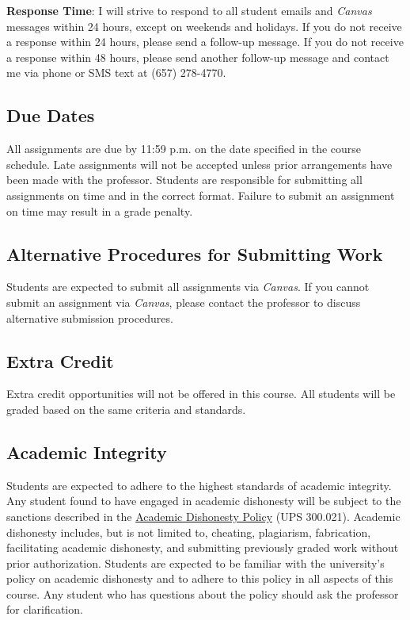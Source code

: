 \documentclass[12pt, letterpaper]{article}
\begin{document}
\textbf{Response Time}: I will strive to respond to all student emails and \emph{Canvas} messages within 24 hours, except on weekends and holidays. If you do not receive a response within 24 hours, please send a follow-up message. If you do not receive a response within 48 hours, please send another follow-up message and contact me via phone or SMS text at (657) 278-4770.

\subsection*{Due Dates}
All assignments are due by 11:59 p.m. on the date specified in the course schedule. Late assignments will not be accepted unless prior arrangements have been made with the professor. Students are responsible for submitting all assignments on time and in the correct format. Failure to submit an assignment on time may result in a grade penalty.

\subsection*{Alternative Procedures for Submitting Work}
Students are expected to submit all assignments via \emph{Canvas}. If you cannot submit an assignment via \emph{Canvas}, please contact the professor to discuss alternative submission procedures.

\subsection*{Extra Credit}
Extra credit opportunities will not be offered in this course. All students will be graded based on the same criteria and standards.

\subsection*{Academic Integrity}
Students are expected to adhere to the highest standards of academic integrity. Any student found to have engaged in academic dishonesty will be subject to the sanctions described in the \href{https://www.fullerton.edu/senate/publications_policies_resolutions/ups/UPS%20300/UPS%20300.021.pdf}{Academic Dishonesty Policy} (UPS 300.021). Academic dishonesty includes, but is not limited to, cheating, plagiarism, fabrication, facilitating academic dishonesty, and submitting previously graded work without prior authorization. Students are expected to be familiar with the university's policy on academic dishonesty and to adhere to this policy in all aspects of this course. Any student who has questions about the policy should ask the professor for clarification.
\end{document}
